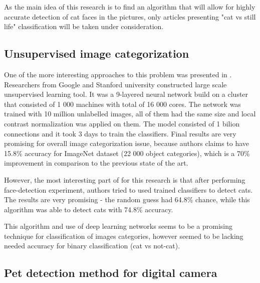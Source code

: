 \documentclass[hyperref]{acmtrans2e}
\begin{document}
As the main idea of this research is to find an algorithm that will allow for highly accurate detection of cat faces in the pictures, only articles presenting "cat vs still life" classification will be taken under consideration.

\subsection{Unsupervised image categorization}
\label{sec:google}
One of the more interesting approaches to this problem was presented in \cite{google:2012}. Researchers from Google and Stanford university constructed large scale unsupervised learning tool. It was a 9-layered neural network build on a cluster that consisted of 1 000 machines with total of 16 000 cores. The network was trained with 10 million unlabelled images, all of them had the same size and local contrast normalization was applied on them. The model consisted of 1 bilion connections and it took 3 days to train the classifiers. Final results are very promising for overall image categorization issue, because authors claims to have 15.8\% accuracy for ImageNet dataset (22 000 object categories), which is a 70\% improvement in comparison to the previous state of the art. 

However, the most interesting part of \cite{google:2012} for this research is that after performing face-detection experiment, authors tried to used trained classifiers to detect cats. The results are very promising - the random guess had 64.8\% chance, while this algorithm was able to detect cats with 74.8\% accuracy.

This algorithm and use of deep learning networks seems to be a promising technique for classification of images categories, however seemed to be lacking needed accuracy for binary classification (cat vs not-cat). 
\subsection{Pet detection method for digital camera}
\label{sec:camera}
\end{document}
